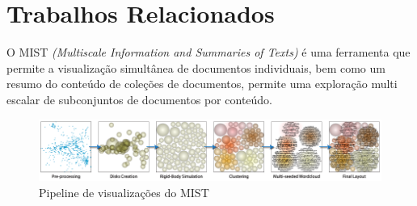 
\section{Trabalhos Relacionados}
\label{Trab_Relac}

O MIST \textit{(Multiscale Information and Summaries of Texts)} é uma ferramenta que permite a visualização simultânea de documentos individuais, bem como um resumo do conteúdo de coleções de documentos, permite uma exploração multi escalar de subconjuntos de documentos por conteúdo\cite{pagliosa2013mist}. 


\begin{figure}[!ht]
	\centering
	\includegraphics[width=1\columnwidth]{images/mist_pipeline.png}
	\caption{Pipeline de visualizações do MIST \cite{pagliosa2013mist}}
	\label{fig:MISTpipeline}
\end{figure}

